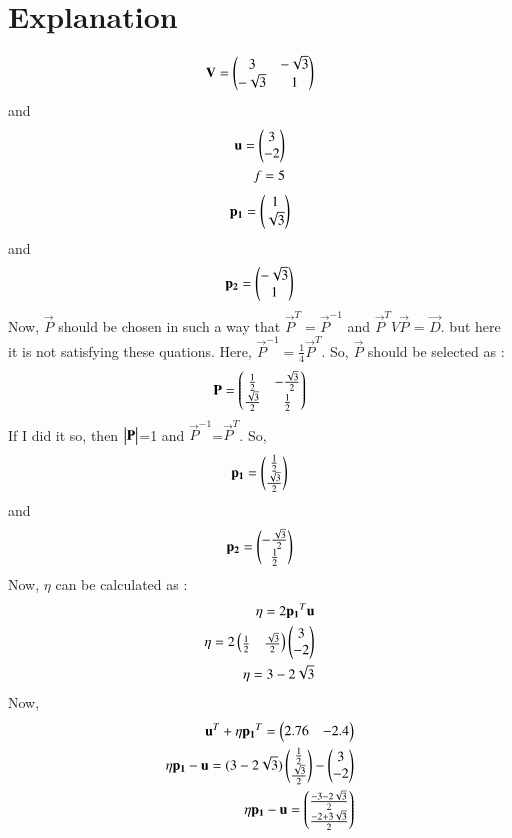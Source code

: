 \documentclass[journal,12pt,twocolumn]{IEEEtran}
\begin{document}
\section{Explanation}

\begin{align}
\mathbf{V} = \begin{pmatrix}3 & -\sqrt{3}\\-\sqrt{3} & 1\end{pmatrix}
\end{align}
and 
\begin{align}
\mathbf{u} = \begin{pmatrix}3 \\ -2\end{pmatrix}\\
f=5
\end{align}
\begin{align}
\mathbf{p_1} = \begin{pmatrix}1 \\ \sqrt{3}\end{pmatrix}
\end{align}
and 
\begin{align}
\mathbf{p_2} = \begin{pmatrix}-\sqrt{3} \\ 1\end{pmatrix}
\end{align}
Now,
$\vec{P}$ should be chosen in such a way that $\vec{P}^T = \vec{P}^{-1}$ and 
$\vec{P}^T V \vec{P}$ = $\vec{D}$. but here it is not satisfying these quations. Here, $\vec{P}^{-1} =\frac{1}{4} \vec{P}^T$. So, $\vec{P}$ should be selected as :
\begin{align}
\mathbf{P} = \begin{pmatrix}\frac{1}{2} & -\frac{\sqrt{3}}{2}\\\frac{\sqrt{3}}{2} & \frac{1}{2}\end{pmatrix}
\end{align}
If I did it so, then $\begin{vmatrix}\mathbf{P}\end{vmatrix}$=1 and $\vec{P}^{-1}$=$\vec{P}^T$.
So,
\begin{align}
\mathbf{p_1} = \begin{pmatrix}\frac{1}{2} \\ \frac{\sqrt{3}}{2}\end{pmatrix}
\end{align}
and 
\begin{align}
\mathbf{p_2} = \begin{pmatrix}-\frac{\sqrt{3}}{2}\\\frac{1}{2}\end{pmatrix}
\end{align}
Now, $\eta$ can be calculated as : 
\begin{align}
\eta = 2 \mathbf{p_1}^T \mathbf{u}\\
\eta = 2 \begin{pmatrix}\frac{1}{2} & \frac{\sqrt{3}}{2}\end{pmatrix} \begin{pmatrix}3 \\ -2\end{pmatrix}\\
\eta =  3-2\sqrt{3}
\end{align}
Now, 
\begin{align}
\mathbf{u}^T + \eta \mathbf{p_1}^T = \begin{pmatrix}2.76 & -2.4\end{pmatrix}\\
\eta \mathbf{p_1} -\mathbf{u}= (3-2\sqrt{3})\begin{pmatrix}\frac{1}{2}\\ \frac{\sqrt{3}}{2} \end{pmatrix} - \begin{pmatrix}3\\-2\end{pmatrix}\\
\eta \mathbf{p_1} -\mathbf{u}=\begin{pmatrix}\frac{-3 - 2\sqrt{3}}{2}\\\frac{-2 +3\sqrt{3}}{2}\end{pmatrix}
\end{align}
\end{document}
